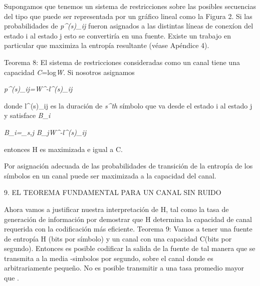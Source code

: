 Supongamos que tenemos un sistema de restricciones sobre las posibles secuencias del tipo que puede ser 
representada por un gr\'afico lineal como la Figura 2. Si las probabilidades de \textit{p^{(s)}_{ij}} fueron 
asignados a las distintas l\'ineas de conex\'ion del estado i al estado j esto se convertir\'ia en una fuente. 
Existe un trabajo en particular que maximiza la entrop\'ia resultante (v\'ease Ap\'endice 4).

Teorema 8: El sistema de restricciones consideradas como un canal tiene una capacidad \textit{C}=log\textit{W}.
Si nosotros asignamos
\begin{center}
\textit{p^{(s)}_{ij}=W^{-l^{(s)}_{ij}} } 
\end{center}
donde l^{(s)_{ij}} es la duraci\'on de \textit{s^{th}} s\'imbolo que va desde el estado i al estado j y satisface 
\textit{B_{i}}

\begin{center}
\textit{B_{i}=\Sigma_{s,j} B_{j}W^{-l^{(s)}_{ij}}}
\end{center}
entonces H es maximizada e igual a C.

Por asignaci\'on adecuada de las probabilidades de transici\'on de la entrop\'ia de los s\'imbolos en un canal 
puede ser maximizada a la capacidad del canal.

\begin{center}
9. EL TEOREMA FUNDAMENTAL PARA UN CANAL SIN RUIDO
\end{center}

Ahora vamos a justificar nuestra interpretaci\'on de H, tal como la tasa de generaci\'on de informaci\'on por 
demostrar que H determina la capacidad de canal requerida con la codificaci\'on m\'as eficiente.
Teorema 9: Vamos a tener una fuente de entrop\'ia H (bits por s\'imbolo) y un canal con una capacidad C(bits por 
segundo). Entonces es posible codificar la salida de la fuente de tal manera que se transmita a la media 
-\epsilon simbolos por segundo, sobre el canal donde es arbitrariamente peque\~{n}o. No es posible 
transmitir a una tasa promedio mayor que .
